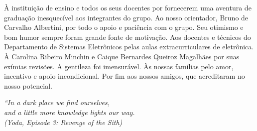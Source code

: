 \documentclass[
	12pt,				%
	openright,			%
	oneside,			%
	a4paper,			%
	hyphens,			%
	english,			%
	brazil				%
]{abntex2}
\begin{document}
	
	
	\frenchspacing 
	
	
	\imprimircapa
	
	\imprimirfolhaderosto*
	
	
	

	
	\begin{agradecimentos}
		À instituição de ensino e todos os seus docentes por fornecerem uma aventura de graduação inesquecível aos integrantes do grupo.
		Ao nosso orientador, Bruno de Carvalho Albertini, por todo o apoio e paciência com o grupo. Seu otimismo e bom humor sempre foram grande fonte de motivação. 
		Aos docentes e técnicos do Departamento de Sistemas Eletrônicos pelas aulas extracurriculares de eletrônica.
		À Carolina Ribeiro Minchin e Caique Bernardes Queiroz Magalhães por suas exímias revisões. A gentileza foi imensurável.
		Às nossas famílias pelo amor, incentivo e apoio incondicional.
		Por fim aos nossos amigos, que acreditaram no nosso potencial.
	\end{agradecimentos}
	
	\begin{epigrafe}
		\vspace*{\fill}
		\begin{flushright}
			\textit{``In a dark place we find ourselves,\\
				and a little more knowledge	lights our way.\\
				(Yoda, Episode 3: Revenge of the Sith)}
		\end{flushright}
	\end{epigrafe}
	
\end{document}
